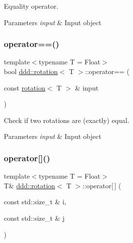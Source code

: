 Equality operator. 


\begin{DoxyParams}{Parameters}
{\em input} & Input object \\
\hline
\end{DoxyParams}
\mbox{\label{classddd_1_1rotation_ae704ea435ead1c66b7ca0bd4899ce2bc}} 
\subsubsection{\texorpdfstring{operator==()}{operator==()}}
{\footnotesize\ttfamily template$<$typename T  = Float$>$ \\
bool \hyperlink{classddd_1_1rotation}{ddd\+::rotation}$<$ T $>$\+::operator== (\begin{DoxyParamCaption}\item[{const \hyperlink{classddd_1_1rotation}{rotation}$<$ T $>$ \&}]{input }\end{DoxyParamCaption})\hspace{0.3cm}{\ttfamily [inline]}}



Check if two rotations are (exactly) equal. 


\begin{DoxyParams}{Parameters}
{\em input} & Input object \\
\hline
\end{DoxyParams}
\mbox{\label{classddd_1_1rotation_a25411622296849f461c6f15aeaf280a0}} 
\subsubsection{\texorpdfstring{operator[]()}{operator[]()}\hspace{0.1cm}{\footnotesize\ttfamily [1/2]}}
{\footnotesize\ttfamily template$<$typename T  = Float$>$ \\
T\& \hyperlink{classddd_1_1rotation}{ddd\+::rotation}$<$ T $>$\+::operator\mbox{[}$\,$\mbox{]} (\begin{DoxyParamCaption}\item[{const std\+::size\+\_\+t \&}]{i,  }\item[{const std\+::size\+\_\+t \&}]{j }\end{DoxyParamCaption})\hspace{0.3cm}{\ttfamily [inline]}}




